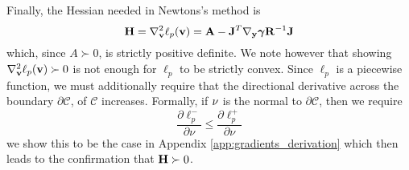 Finally, the Hessian needed in Newtons's method is
\begin{equation}
	\mf{H}= \nabla_\mf{v}^2\ell_p(\mf{v}) = \mf{A} -\mf{J}^T\nabla_\mf{y}\bgamma \mf{R}^{-1}\mf{J}	
	\label{eq:ell_hessian}
\end{equation}
which, since $A\succ 0$, is strictly positive definite. We note however that
showing $\nabla_{\mathbf{v}}^2\ell_p({\mathbf{v}})\succ 0$ is not enough for $\ell_p$ to be
strictly convex. Since $\ell_p$ is a piecewise function, we must additionally
require that the directional derivative across the boundary
$\partial\mathcal{C}$, of $\mathcal{C}$ increases. Formally, if ${\mathbf{\nu}}$ is
the normal to $\partial\mathcal{C}$, then we require
\begin{equation}
	\frac{\partial \ell_p^-}{\partial \nu} \le \frac{\partial \ell_p^+}{\partial \nu}
\end{equation}
we show this to be the case in Appendix \ref{app:gradients_derivation} which
then leads to the confirmation that ${\mathbf{H}}\succ 0$.



